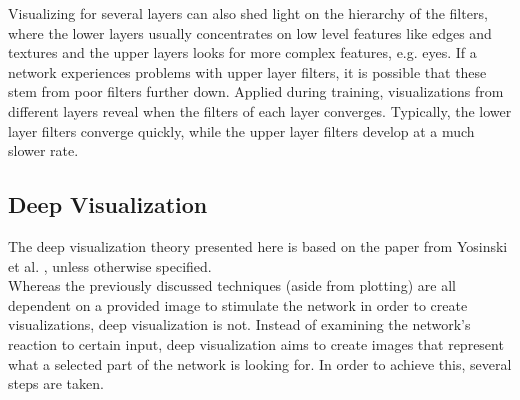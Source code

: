 \noindent Visualizing for several layers can also shed light on the hierarchy of the filters, where the lower layers usually concentrates on low level features like edges and textures and the upper layers looks for more complex features, e.g. eyes. If a network experiences problems with upper layer filters, it is possible that these stem from poor filters further down. Applied during training, visualizations from different layers reveal when the filters of each layer converges. Typically, the lower layer filters converge quickly, while the upper layer filters develop at a much slower rate.

\subsection{Deep Visualization} \label{sec:deep-vis}

The deep visualization theory presented here is based on the paper from Yosinski et al. \cite{yosinski-deepvis}, unless otherwise specified. \\

\noindent Whereas the previously discussed techniques (aside from plotting) are all dependent on a provided image to stimulate the network in order to create visualizations, deep visualization is not. Instead of examining the network's reaction to certain input, deep visualization aims to create images that represent what a selected part of the network is looking for. In order to achieve this, several steps are taken. \\

